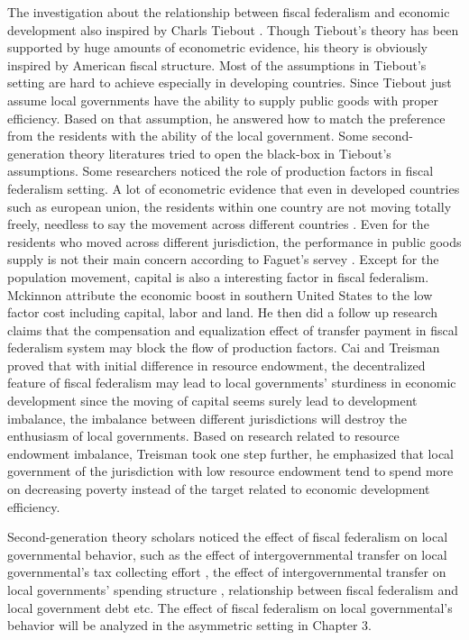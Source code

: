 The investigation about the relationship between fiscal federalism and economic development also inspired by Charls Tiebout \cite{tiebout1956pure}. Though Tiebout's theory has been supported by huge amounts of econometric evidence, his theory is obviously inspired by American fiscal structure. Most of the assumptions in Tiebout's setting are hard to achieve especially in developing countries. Since Tiebout just assume local governments have the ability to supply public goods with proper efficiency. Based on that assumption, he answered how to match the preference from the residents with the ability of the local government. Some second-generation theory literatures tried to open the black-box in Tiebout's assumptions. Some researchers noticed the role of production factors in fiscal federalism setting. A lot of econometric evidence that even in developed countries such as european union, the residents within one country are not moving totally freely, needless to say the movement across different countries \cite{oates2004essay}. Even for the residents who moved across different jurisdiction, the performance in public goods supply is not their main concern according to Faguet's servey \cite{faguet2004does}. Except for the population movement, capital is also a interesting factor in fiscal federalism. Mckinnon \cite{mckinnon1993order} attribute the economic boost in southern United States to the low factor cost including capital, labor and land. He then did a follow up research claims that the compensation and equalization effect of transfer payment in fiscal federalism system may block the flow of production factors. Cai and Treisman \cite{cai2005does} proved that with initial difference in resource endowment, the decentralized feature of fiscal federalism may lead to local governments' sturdiness in economic development since the moving of capital seems surely lead to development imbalance, the imbalance between different jurisdictions will destroy the enthusiasm of local governments. Based on research related to resource endowment imbalance, Treisman \cite{treisman2002decentralization} took one step further, he emphasized that local government of the jurisdiction with low resource endowment tend to spend more on decreasing poverty instead of the target related to economic development efficiency. 

Second-generation theory scholars noticed the effect of fiscal federalism on local governmental behavior, such as the effect of intergovernmental transfer on local governmental's tax collecting effort \cite{mogues2012external}, the effect of intergovernmental transfer on local governments' spending structure \cite{hines1995anomalies}, relationship between fiscal federalism and local government debt \cite{qian1998federalism} etc. The effect of fiscal federalism on local governmental's behavior will be analyzed in the asymmetric setting in Chapter 3.

